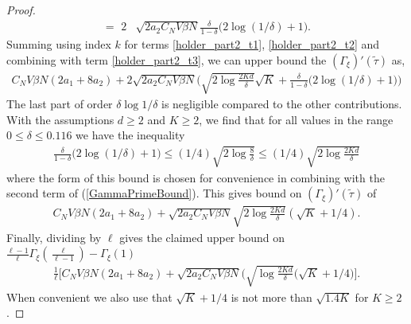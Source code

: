\documentclass{article}
\numberwithin{equation}{section}
\theoremstyle{Lemma}
\theoremstyle{Corollary}
\theoremstyle{Theorem}
\theoremstyle{Remark}
\begin{document}
\begin{proof}
\begin{align}
= \,\,2& \sqrt{2a_{2}C_{N}V\beta N}\frac{\delta}{1-\delta}\big(2\log(1/\delta)+1\big) .\label{holder_part2_t3}
\end{align}
Summing using index $k$ for terms \eqref{holder_part2_t1}, \eqref{holder_part2_t2} and combining with term \eqref{holder_part2_t3}, we can upper bound the $(\Gamma_\xi)'(\tilde \tau)$ as,
\begin{align}
C_{N}V\beta N(2a_1+8a_2)+2\sqrt{2a_2 C_N V\beta N} \Big( \sqrt{2\log \frac{2Kd}{\delta}}\sqrt{K}+    \frac{\delta}{1-\delta}\big(2\log(1/\delta) +1\big)\Big) \label{GammaPrimeBound}
\end{align}
The last part of order $\delta \log 1/\delta$ is negligible compared to the other contributions. With the assumptions $d\ge 2$ and $K \geq 2$,
we find that for all values in the range $0 \le \delta \le 0.116$ we have the inequality
\begin{align}
 \frac{\delta}{1-\delta}\big(2\log(1/\delta)+1\big) \leq (1/4)\sqrt{2\log \frac{8}{\delta}} \leq (1/4)\sqrt{2 \log \frac{2Kd}{\delta}}
\end{align}
where the form of this bound is chosen for convenience in combining with the second term of (\ref{GammaPrimeBound}). This gives bound on $(\Gamma_\xi)'(\tilde \tau)$ of 
\begin{align}
C_N V\beta N(2a_1+8a_2)+\sqrt{2a_2 C_N V\beta N} \sqrt{2\log \frac{2Kd}{\delta}}(\sqrt{K}+1/4).
\end{align}
Finally, dividing by $\ell$ gives the claimed upper bound on $\frac{\ell-1}{\ell}\Gamma_{\xi}(\frac{\ell}{\ell-1})-\Gamma_{\xi}(1)$
\begin{align}
\frac{1}{\ell} \Big[ C_{N}V\beta N(2a_{1}+8a_{2})+\sqrt{2a_2 C_{N}V\beta N}\Big(\sqrt{\log \frac{2Kd}{\delta}}(\sqrt{K}+1/4\Big)\Big].
\end{align}
When convenient we also use that $\sqrt{K}+1/4$ is not more than $\sqrt{1.4 K}$ for $K\ge 2$.
\end{proof}
\end{document}
